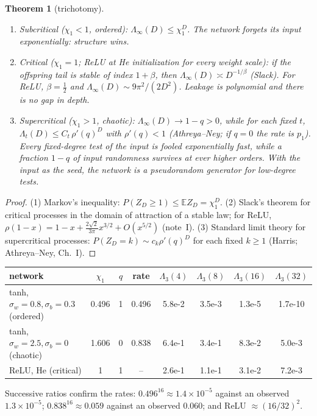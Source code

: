 \documentclass[11pt]{article}
\newtheorem{theorem}{Theorem}[section]
\theoremstyle{definition}
\theoremstyle{remark}
\newcommand{\E}{\mathbb E}
\begin{document}
\begin{theorem}[trichotomy]\label{thm:gw}
\begin{enumerate}
\item \emph{Subcritical} ($\chi_1<1$, ordered): $\Lambda_\infty(D)\le\chi_1^D$. The network forgets its input exponentially: structure wins.
\item \emph{Critical} ($\chi_1=1$; ReLU at He initialization for every weight scale): if the offspring tail is stable of index $1+\beta$, then $\Lambda_\infty(D)\asymp D^{-1/\beta}$ (Slack). For ReLU, $\beta=\frac12$ and $\Lambda_\infty(D)\sim9\pi^2/(2D^2)$. Leakage is polynomial and there is no gap in depth.
\item \emph{Supercritical} ($\chi_1>1$, chaotic): $\Lambda_\infty(D)\to1-q>0$, while for each fixed $t$, $\Lambda_t(D)\le C_t\,\rho'(q)^D$ with $\rho'(q)<1$ (Athreya--Ney; if $q=0$ the rate is $p_1$). Every fixed-degree test of the input is fooled exponentially fast, while a fraction $1-q$ of input randomness survives at ever higher orders. With the input as the seed, the network is a pseudorandom generator for low-degree tests.
\end{enumerate}
\end{theorem}

\begin{proof}
(1) Markov's inequality: $P(Z_D\ge1)\le\E Z_D=\chi_1^D$.
(2) Slack's theorem for critical processes in the domain of attraction of a stable law; for ReLU, $\rho(1-x)=1-x+\frac{2\sqrt2}{3\pi}x^{3/2}+O(x^{5/2})$ (note~I).
(3) Standard limit theory for supercritical processes: $P(Z_D=k)\sim c_k\rho'(q)^D$ for each fixed $k\ge1$ (Harris; Athreya--Ney, Ch.~I).
\end{proof}

\begin{center}\small
\begin{tabular}{lccccccc}
\toprule
network & $\chi_1$ & $q$ & rate & $\Lambda_3(4)$ & $\Lambda_3(8)$ & $\Lambda_3(16)$ & $\Lambda_3(32)$\\
\midrule
tanh, $\sigma_w=0.8,\sigma_b=0.3$ (ordered) & 0.496 & 1 & 0.496 & 5.8e-2 & 3.5e-3 & 1.3e-5 & 1.7e-10\\
tanh, $\sigma_w=2.5,\sigma_b=0$ (chaotic) & 1.606 & 0 & 0.838 & 6.4e-1 & 3.4e-1 & 8.3e-2 & 5.0e-3\\
ReLU, He (critical) & 1 & 1 & -- & 2.6e-1 & 1.1e-1 & 3.1e-2 & 7.2e-3\\
\bottomrule
\end{tabular}
\end{center}
\noindent Successive ratios confirm the rates: $0.496^{16}\approx1.4\times10^{-5}$ against an observed $1.3\times10^{-5}$; $0.838^{16}\approx0.059$ against an observed $0.060$; and ReLU $\approx(16/32)^{2}$.
\end{document}
